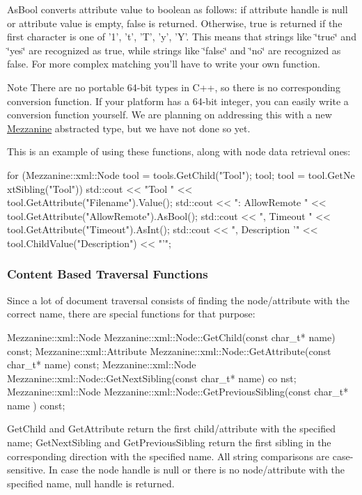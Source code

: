 AsBool converts attribute value to boolean as follows: if attribute handle is null or attribute value is empty, false is returned. Otherwise, true is returned if the first character is one of '1', 't', 'T', 'y', 'Y'. This means that strings like \char`\"{}true\char`\"{} and \char`\"{}yes\char`\"{} are recognized as true, while strings like \char`\"{}false\char`\"{} and \char`\"{}no\char`\"{} are recognized as false. For more complex matching you'll have to write your own function. \begin{DoxyNote}{Note}
There are no portable 64-\/bit types in C++, so there is no corresponding conversion function. If your platform has a 64-\/bit integer, you can easily write a conversion function yourself. We are planning on addressing this with a new \hyperlink{namespaceMezzanine}{Mezzanine} abstracted type, but we have not done so yet.
\end{DoxyNote}
This is an example of using these functions, along with node data retrieval ones: 
\begin{DoxyCode}
 for (Mezzanine::xml::Node tool = tools.GetChild("Tool"); tool; tool = tool.GetNe
      xtSibling("Tool"))
 {
     std::cout << "Tool " << tool.GetAttribute("Filename").Value();
     std::cout << ": AllowRemote " << tool.GetAttribute("AllowRemote").AsBool();
     std::cout << ", Timeout " << tool.GetAttribute("Timeout").AsInt();
     std::cout << ", Description '" << tool.ChildValue("Description") << "'\n";
 }
\end{DoxyCode}
 \hypertarget{XMLManual_XMLAccessingContentBased}{}\subsubsection{Content Based Traversal Functions}\label{XMLManual_XMLAccessingContentBased}
Since a lot of document traversal consists of finding the node/attribute with the correct name, there are special functions for that purpose: 
\begin{DoxyCode}
 Mezzanine::xml::Node Mezzanine::xml::Node::GetChild(const char_t* name) const;
 Mezzanine::xml::Attribute Mezzanine::xml::Node::GetAttribute(const char_t* name)
       const;
 Mezzanine::xml::Node Mezzanine::xml::Node::GetNextSibling(const char_t* name) co
      nst;
 Mezzanine::xml::Node Mezzanine::xml::Node::GetPreviousSibling(const char_t* name
      ) const;
\end{DoxyCode}
 GetChild and GetAttribute return the first child/attribute with the specified name; GetNextSibling and GetPreviousSibling return the first sibling in the corresponding direction with the specified name. All string comparisons are case-\/sensitive. In case the node handle is null or there is no node/attribute with the specified name, null handle is returned. \par
